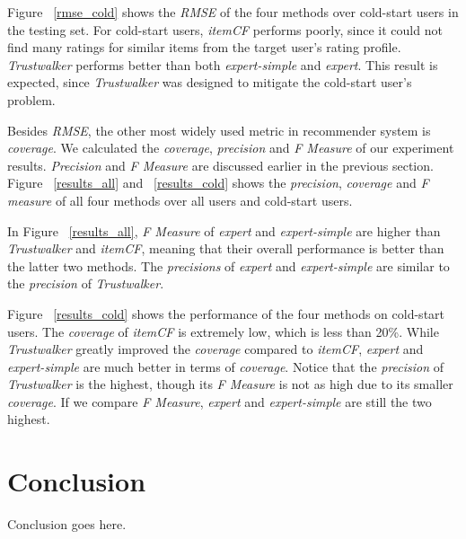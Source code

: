 \documentclass[12pt]{article}
\begin{document}
Figure ~\ref{rmse_cold} shows the \emph{RMSE} of the four methods over cold-start users in the testing set. For cold-start users, \emph{itemCF} performs poorly, since it could not find many ratings for similar items from the target user's rating profile. \emph{Trustwalker} performs better than both \emph{expert-simple} and \emph{expert}. This result is expected, since \emph{Trustwalker} was designed to mitigate the cold-start user's problem. 



Besides \emph{RMSE}, the other most widely used metric in recommender system is \emph{coverage}. We calculated the \emph{coverage}, \emph{precision} and \emph{F Measure} of our experiment results. \emph{Precision} and \emph{F Measure} are discussed earlier in the previous section. Figure ~\ref{results_all} and ~\ref{results_cold} shows the \emph{precision}, \emph{coverage} and \emph{F measure} of all four methods over all users and cold-start users. 

In Figure ~\ref{results_all}, \emph{F Measure} of \emph{expert} and \emph{expert-simple} are higher than \emph{Trustwalker} and \emph{itemCF}, meaning that their overall performance is better than the latter two methods. The \emph{precisions} of \emph{expert} and \emph{expert-simple} are similar to the \emph{precision} of \emph{Trustwalker}. 

Figure ~\ref{results_cold} shows the performance of the four methods on cold-start users. The \emph{coverage} of \emph{itemCF} is extremely low, which is less than 20\%. While \emph{Trustwalker} greatly improved the \emph{coverage} compared to \emph{itemCF}, \emph{expert} and \emph{expert-simple} are much better in terms of \emph{coverage}. Notice that the \emph{precision} of \emph{Trustwalker} is the highest, though its \emph{F Measure} is not as high due to its smaller \emph{coverage}. If we compare \emph{F Measure}, \emph{expert} and \emph{expert-simple} are still the two highest.

\section{Conclusion}
Conclusion goes here.



\end{document}
